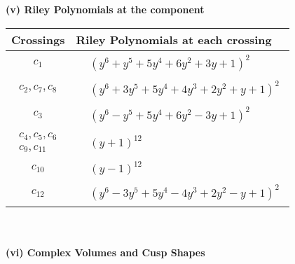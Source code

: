 \documentclass[1p]{elsarticle_modified}
\theoremstyle{definition}
\begin{document}
\newpage\renewcommand{\arraystretch}{1}
\flushleft \textbf{(v) Riley Polynomials at the component}\newline \\
\begin{tabular}{m{50pt}|m{274pt}}
Crossings & \hspace{64pt}Riley Polynomials at each crossing \\
\hline $$\begin{aligned}c_{1}\end{aligned}$$&$\begin{aligned}
&(y^6+y^5+5 y^4+6 y^2+3 y+1)^2
\end{aligned}$\\
\hline $$\begin{aligned}c_{2},c_{7},c_{8}\end{aligned}$$&$\begin{aligned}
&(y^6+3 y^5+5 y^4+4 y^3+2 y^2+y+1)^2
\end{aligned}$\\
\hline $$\begin{aligned}c_{3}\end{aligned}$$&$\begin{aligned}
&(y^6- y^5+5 y^4+6 y^2-3 y+1)^2
\end{aligned}$\\
\hline $$\begin{aligned}c_{4},c_{5},c_{6}\\c_{9},c_{11}\end{aligned}$$&$\begin{aligned}
&(y+1)^{12}
\end{aligned}$\\
\hline $$\begin{aligned}c_{10}\end{aligned}$$&$\begin{aligned}
&(y-1)^{12}
\end{aligned}$\\
\hline $$\begin{aligned}c_{12}\end{aligned}$$&$\begin{aligned}
&(y^6-3 y^5+5 y^4-4 y^3+2 y^2- y+1)^2
\end{aligned}$\\
\hline
\end{tabular}\\~\\
\newpage\flushleft \textbf{(vi) Complex Volumes and Cusp Shapes}
\end{document}
